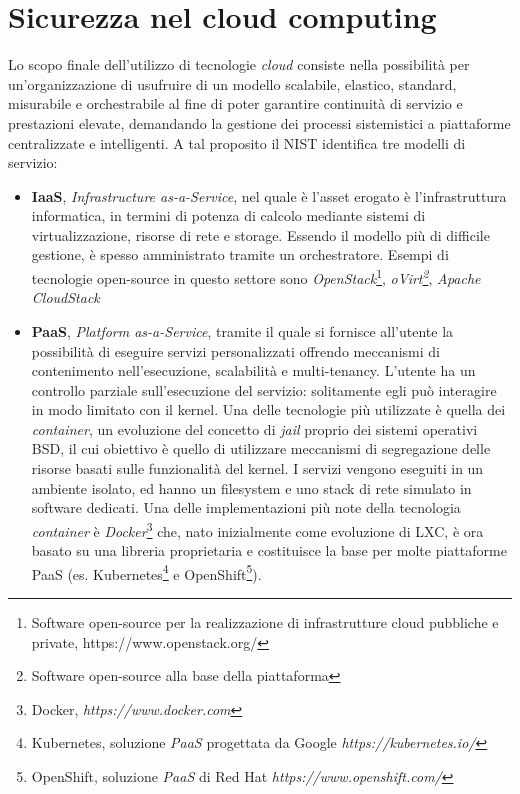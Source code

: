 \documentclass[../main.tex]{subfiles}
\begin{document}
\section{Sicurezza nel cloud computing}
Lo scopo finale dell'utilizzo di tecnologie \textit{cloud} consiste nella possibilità per un'organizzazione di usufruire di un modello scalabile, elastico, standard, misurabile e orchestrabile al fine di poter garantire continuità di servizio e prestazioni elevate, demandando la gestione dei processi sistemistici a piattaforme centralizzate e intelligenti.
A tal proposito il NIST\cite{NISTCloud} identifica tre modelli di servizio:
\begin{itemize}
    \item \textbf{IaaS}, \textit{Infrastructure as-a-Service}, nel quale è l'asset erogato è l'infrastruttura informatica, in termini di potenza di calcolo mediante sistemi di virtualizzazione, risorse di rete e storage. Essendo il modello più di difficile gestione, è spesso amministrato tramite un orchestratore. Esempi di tecnologie open-source in questo settore sono \textit{OpenStack}\footnote{Software open-source per la realizzazione di infrastrutture cloud pubbliche e private, https://www.openstack.org/}, \textit{oVirt\footnote{Software open-source alla base della piattaforma }}, \textit{Apache CloudStack}
    \item \textbf{PaaS}, \textit{Platform as-a-Service}, tramite il quale si fornisce all'utente la possibilità di eseguire servizi personalizzati offrendo meccanismi di contenimento nell'esecuzione, scalabilità e multi-tenancy. L'utente ha un controllo parziale sull'esecuzione del servizio: solitamente egli può interagire in modo limitato con il kernel. Una delle tecnologie più utilizzate è quella dei \textit{container}, un evoluzione del concetto di \textit{jail} proprio dei sistemi operativi BSD, il cui obiettivo è quello di utilizzare meccanismi di segregazione delle risorse basati sulle funzionalità del kernel. I servizi vengono eseguiti in un ambiente isolato, ed hanno un filesystem e uno stack di rete simulato in software dedicati. Una delle implementazioni più note della tecnologia \textit{container} è \textit{Docker}\footnote{Docker, \textit{https://www.docker.com}} che, nato inizialmente come evoluzione di LXC, è ora basato su una libreria proprietaria e costituisce la base per molte piattaforme PaaS (es. Kubernetes\footnote{Kubernetes, soluzione \textit{PaaS} progettata da Google \textit{https://kubernetes.io/}} e OpenShift\footnote{OpenShift, soluzione \textit{PaaS} di Red Hat \textit{https://www.openshift.com/}}). 

\end{itemize}
\end{document}
